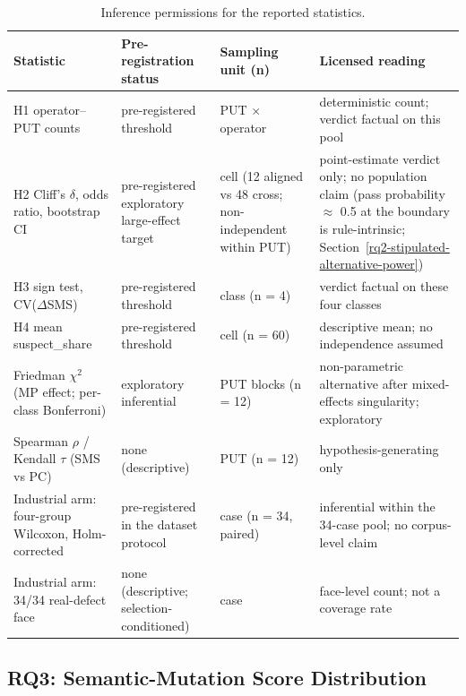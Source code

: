 \documentclass[manuscript,screen,review]{acmart}
\begin{document}
{%
\begin{longtable}[]{@{}
  >{\raggedright\arraybackslash}p{}
  >{\raggedright\arraybackslash}p{}
  >{\raggedright\arraybackslash}p{}
  >{\raggedright\arraybackslash}p{}@{}}
\caption{Inference permissions for the reported statistics.}\label{tab:inference-permissions}\\
\toprule\noalign{}
Statistic & Pre-registration status & Sampling unit (n) & Licensed reading \\
\midrule\noalign{}
\endfirsthead
\endhead
\bottomrule\noalign{}
\endlastfoot
H1 operator--PUT counts & pre-registered threshold & PUT $\times$
operator & deterministic count; verdict factual on this pool \\
H2 Cliff's $\delta$, odds ratio, bootstrap CI & pre-registered
exploratory large-effect target & cell (12 aligned vs 48 cross;
non-independent within PUT) & point-estimate verdict only; no
population claim (pass probability $\approx$ 0.5 at the boundary is
rule-intrinsic; Section~\ref{rq2-stipulated-alternative-power}) \\
H3 sign test, CV($\Delta$SMS) & pre-registered threshold & class (n = 4)
& verdict factual on these four classes \\
H4 mean suspect\_share & pre-registered threshold & cell (n = 60) &
descriptive mean; no independence assumed \\
Friedman $\chi^2$ (MP effect; per-class Bonferroni) & exploratory
inferential & PUT blocks (n = 12) & non-parametric alternative after
mixed-effects singularity; exploratory \\
Spearman $\rho$ / Kendall $\tau$ (SMS vs PC) & none (descriptive) & PUT
(n = 12) & hypothesis-generating only \\
Industrial arm: four-group Wilcoxon, Holm-corrected & pre-registered in
the dataset protocol & case (n = 34, paired) & inferential within the
34-case pool; no corpus-level claim \\
Industrial arm: 34/34 real-defect face & none (descriptive; selection-conditioned) & case &
face-level count; not a coverage rate \\
\end{longtable}
}

\subsection{RQ3: Semantic-Mutation Score Distribution}\label{rq1-60-cell-distribution}
\end{document}
